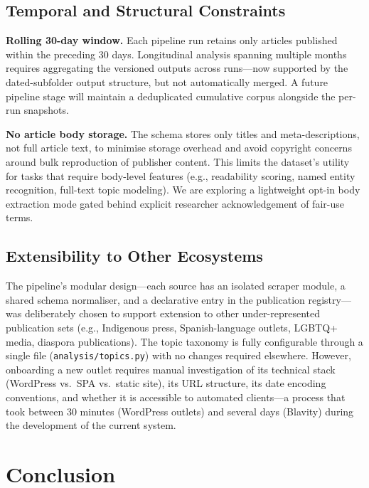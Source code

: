 \documentclass[sigconf,anonymous]{acmart}
\begin{document}
\subsection{Temporal and Structural Constraints}

\noindent\textbf{Rolling 30-day window.}
Each pipeline run retains only articles published within the preceding 30 days.
Longitudinal analysis spanning multiple months requires aggregating the
versioned outputs across runs---now supported by the dated-subfolder output
structure, but not automatically merged.
A future pipeline stage will maintain a deduplicated cumulative corpus alongside
the per-run snapshots.

\noindent\textbf{No article body storage.}
The schema stores only titles and meta-descriptions, not full article text,
to minimise storage overhead and avoid copyright concerns around bulk
reproduction of publisher content.
This limits the dataset's utility for tasks that require body-level features
(e.g., readability scoring, named entity recognition, full-text topic modeling).
We are exploring a lightweight opt-in body extraction mode gated behind
explicit researcher acknowledgement of fair-use terms.

\subsection{Extensibility to Other Ecosystems}

The pipeline's modular design---each source has an isolated scraper module, a
shared schema normaliser, and a declarative entry in the publication registry---
was deliberately chosen to support extension to other under-represented
publication sets (e.g., Indigenous press, Spanish-language outlets, LGBTQ+
media, diaspora publications).
The topic taxonomy is fully configurable through a single file
(\texttt{analysis/topics.py}) with no changes required elsewhere.
However, onboarding a new outlet requires manual investigation of its technical
stack (WordPress vs.\ SPA vs.\ static site), its URL structure, its date
encoding conventions, and whether it is accessible to automated clients---a
process that took between 30 minutes (WordPress outlets) and several days
(Blavity) during the development of the current system.

\section{Conclusion}
\end{document}

